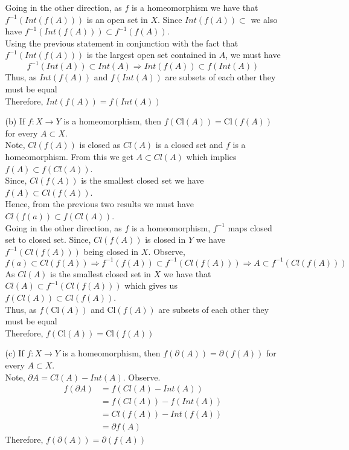 \documentclass[12pt]{article}
\begin{document}
\begin{enumerate}
\begin{enumerate}
		Going in the other direction, as $ f $ is a homeomorphism  we have that $ f^{-1}(Int(f(A))) $ is an open set in $ X $. Since $ Int(f(A)) \subset $ we also have $ f^{-1}(Int(f(A))) \subset f^{-1}(f(A)) $.\\
		 Using the previous statement in conjunction with the fact that $ f^{-1}(Int(f(A))) $ is the largest open set contained in $ A $, we must have
			 \[f^{-1}(Int(A))\subset Int(A) \Rightarrow Int(f(A)) \subset f(Int(A))\]
		Thus, as $ Int(f(A)) $ and $ f(Int(A)) $ are subsets of each other they must be equal\\
		Therefore, $ Int(f(A)) = f(Int(A)) $
		\item[(b)] If $f : X \rightarrow Y$ is a homeomorphism, then $f ( \mathrm { Cl } ( A ) ) = \mathrm { Cl } ( f ( A ) )$ for every $A \subset X .$\\
		Note, $ Cl(f(A)) $ is closed as $ Cl(A) $ is a closed set and $ f $ is a homeomorphism. From this we get $ A\subset Cl(A) $ which implies $ f(A) \subset f(Cl(A)) $.\\
		Since, $ Cl(f(A)) $ is the smallest closed set we have $ f(A)\subset Cl(f(A)) $.\\
		Hence, from the previous two results we must have $ Cl(f(a)) \subset f(Cl(A))$.\\
		Going in the other direction, as $ f $ is a homeomorphism, $ f^{-1} $ maps closed set to closed set. Since, $ Cl(f(A))  $ is closed in $ Y $ we have $ f^{-1}(Cl(f(A))) $ being closed in $ X $. Observe,
			\[f(a)\subset Cl(f(A)) \Rightarrow f^{-1}(f(A))\subset f^{-1}(Cl(f(A))) \Rightarrow A \subset f^{-1}(Cl(f(A))) \]
		As $ Cl(A) $ is the smallest closed set in $ X $ we have that $ Cl(A) \subset f^{-1}(Cl(f(A))) $ which gives us $ f(Cl(A)) \subset Cl(f(A)) $.\\
		Thus, as $ f ( \mathrm { Cl } ( A ) ) $ and $ \mathrm { Cl } ( f ( A ) )  $ are subsets of each other they must be equal\\
		Therefore, $ f ( \mathrm { Cl } ( A ) ) = \mathrm { Cl } ( f ( A ) ) $
		\item[(c)] If $f : X \rightarrow Y$ is a homeomorphism, then $f ( \partial ( A ) ) = \partial ( f ( A ) )$ for every	$A \subset X .$\\
		Note, $ \partial A = Cl(A)-Int(A) $. Observe.
			\begin{align*}
				f(\partial A) &= f(Cl(A)-Int(A)) \\
							  &= f(Cl(A)) - f(Int(A))\\
							  &= Cl(f(A)) - Int(f(A))\\
							  &= \partial f(A) 
			\end{align*}
			Therefore, $f ( \partial ( A ) ) = \partial ( f ( A ) )$
	\end{enumerate}
	

\end{enumerate}
\end{document}
